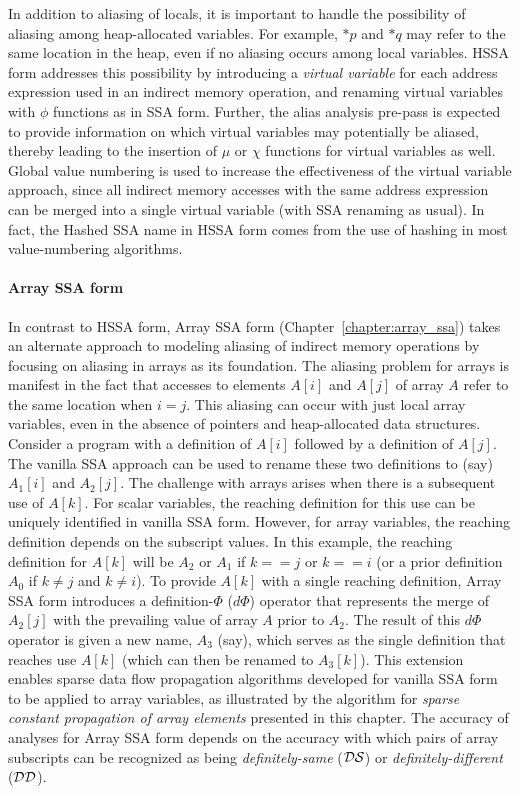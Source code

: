 In addition to aliasing of locals, it is important to handle the possibility of  aliasing among heap-allocated variables.  For example, $*p$ and $*q$ may refer to the same location in the heap, even if no aliasing occurs among local variables.  HSSA form addresses this possibility by introducing a {\em virtual variable} for each address expression used in an indirect memory operation, and renaming virtual variables with $\phi$ functions as in SSA form.  Further, the alias analysis pre-pass is expected to provide information on which virtual variables may potentially be aliased, thereby leading to the insertion of $\mu$ or $\chi$ functions for virtual variables as well.  Global value numbering is used to increase the effectiveness of the virtual variable approach, since all indirect memory accesses with the same address expression can be merged into a single virtual variable (with SSA renaming as usual).  In fact, the Hashed SSA name in HSSA form comes from the use of hashing in most value-numbering algorithms.

\paragraph{Array SSA form}

In contrast to HSSA form, Array SSA form (Chapter~\ref{chapter:array_ssa}) takes an alternate approach to modeling aliasing of indirect memory operations by focusing on aliasing in arrays as its foundation.  The aliasing problem for arrays is manifest in the fact that accesses to elements $A[i]$ and $A[j]$ of array $A$ refer to the same location when $i = j$.  This aliasing can occur with just local array variables, even in the absence of pointers and heap-allocated data structures.  Consider a program with a definition of $A[i]$ followed by a definition of $A[j]$.  The vanilla SSA approach can be used to rename these two definitions to (say) $A_1[i]$ and $A_2[j]$.  The challenge with arrays arises when there is a subsequent use of $A[k]$.  For scalar variables, the reaching definition for this use can be uniquely identified in vanilla SSA form.  However, for array variables, the reaching definition depends on the subscript values.  In this example, the reaching definition for $A[k]$ will be $A_2$ or $A_1$ if $k == j$ or $k == i$ (or a prior definition $A_0$ if $k \not= j$ and $k \not= i$).  To provide $A[k]$ with a single reaching definition, 
Array SSA form introduces a definition-$\Phi$ ($d\Phi$) operator that represents the merge of $A_2[j]$ with the prevailing value of array $A$ prior to $A_2$.  The result of this $d\Phi$ operator is given a new name, $A_3$ (say), which serves as the single definition that reaches use $A[k]$ (which can then be renamed to $A_3[k]$).  This extension enables sparse data flow propagation algorithms developed for vanilla SSA form to be applied to array variables, as illustrated by the algorithm for {\em  sparse constant propagation of array elements} presented in this chapter.  The accuracy of analyses for Array SSA form depends on the accuracy with which pairs of array subscripts can be recognized as being {\em definitely-same} (${\cal DS}$) or {\em definitely-different} (${\cal DD}$).

